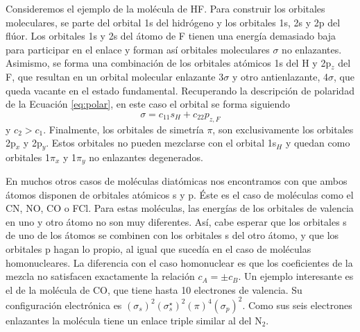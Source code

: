 \documentclass{tufte-handout}
\begin{document}
Consideremos el ejemplo de la molécula de HF. 
Para construir los orbitales moleculares, se parte del orbital 1s del hidrógeno y los orbitales 1s, 2s y 2p del flúor. 
Los orbitales 1s y 2s del átomo de F tienen una energía demasiado baja para participar en el enlace y forman así orbitales moleculares $\sigma$ no enlazantes. 
Asimismo, se forma una combinación de los orbitales atómicos 1s del H y 2p$_z$ del F, que resultan en un orbital molecular enlazante 3$\sigma$ y otro antienlazante, 4$\sigma$, que queda vacante en el estado fundamental. 
Recuperando la descripción de polaridad de la Ecuación
\ref{eq:polar}, en este caso el orbital se forma siguiendo
\begin{equation}
    \sigma=c_11s_H + c_22p_{z,F}
\end{equation}
y $c_2>c_1$. 
Finalmente, los orbitales de simetría $\pi$, son exclusivamente los orbitales 2p$_x$ y 2p$_y$. 
Estos orbitales no pueden mezclarse con el orbital 1s$_H$ y quedan como orbitales 1$\pi_x$ y 1$\pi_y$ no enlazantes degenerados. 

En muchos otros casos de moléculas diatómicas nos encontramos con que ambos átomos disponen de orbitales atómicos s y p. 
Éste es el caso de moléculas como el CN, NO, CO o FCl. Para estas moléculas, las energías de los orbitales de valencia en uno y otro átomo no son muy diferentes. Así, cabe esperar que los orbitales s de uno de los átomos se combinen con los orbitales s del otro átomo,  y que los orbitales p hagan lo propio, al igual que sucedía en el caso de moléculas homonucleares. 
La diferencia con el caso homonuclear es que los coeficientes de la mezcla no satisfacen exactamente la relación $c_A = \pm c_B$.
Un ejemplo interesante es el de la molécula de CO, que tiene hasta 10 electrones de valencia. 
Su configuración electrónica es $(\sigma_s)^2(\sigma_s^{\star})^2(\pi)^4(\sigma_p)^2$.
Como sus seis electrones enlazantes la molécula tiene un enlace triple similar al del N$_2$.


\pagebreak
\appendix
\end{document}
